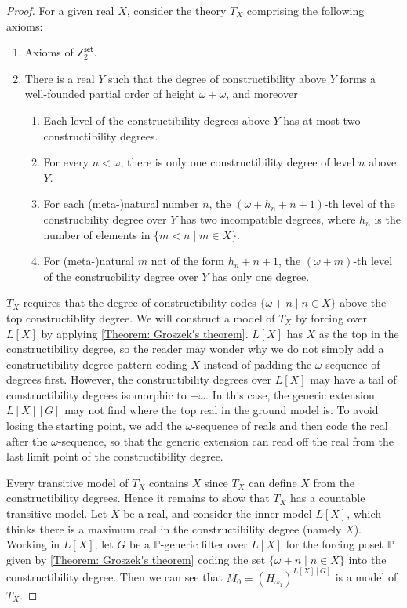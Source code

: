\documentclass[10pt,a4paper]{amsart}
\newcommand{\set}{\mathsf{set}}
\begin{document}
\begin{proof}
    For a given real $X$, consider the theory $T_X$ comprising the following axioms:
    \begin{enumerate}
        \item Axioms of $\mathsf{Z}_2^\set$.
        \item There is a real $Y$ such that the degree of constructibility above $Y$ forms a well-founded partial order of height $\omega+\omega$, and moreover
        \begin{enumerate}
            \item Each level of the constructibility degrees above $Y$ has at most two constructibility degrees.
            \item For every $n<\omega$, there is only one constructibility degree of level $n$ above $Y$.
            \item For each (meta-)natural number $n$, the $(\omega+h_n+n+1)$-th level of the construcbility degree over $Y$ has two incompatible degrees, where $h_n$ is the number of elements in $\{m<n\mid m\in X\}$.
            \item For (meta-)natural $m$ not of the form $h_n+n+1$, the $(\omega+m)$-th level of the construcbility degree over $Y$ has only one degree.
        \end{enumerate}
    \end{enumerate}
    $T_X$ requires that the degree of constructibility codes $\{\omega + n\mid n\in X\}$ above the top constructiblity degree. 
    We will construct a model of $T_X$ by forcing over $L[X]$ by applying \autoref{Theorem: Groszek's theorem}. $L[X]$ has $X$ as the top in the constructibility degree, so the reader may wonder why we do not simply add a constructibility degree pattern coding $X$ instead of padding the $\omega$-sequence of degrees first.
    However, the constructibility degrees over $L[X]$ may have a tail of constructibility degrees isomorphic to $-\omega$. In this case, the generic extension $L[X][G]$ may not find where the top real in the ground model is. To avoid losing the starting point, we add the $\omega$-sequence of reals and then code the real after the $\omega$-sequence, so that the generic extension can read off the real from the last limit point of the constructibility degree.

    Every transitive model of $T_X$ contains $X$ since $T_X$ can define $X$ from the constructibility degrees. Hence it remains to show that $T_X$ has a countable transitive model.
    Let $X$ be a real, and consider the inner model $L[X]$, which thinks there is a maximum real in the constructibility degree (namely $X$).
    Working in $L[X]$, let $G$ be a $\mathbb{P}$-generic filter over $L[X]$ for the forcing poset $\mathbb{P}$ given by \autoref{Theorem: Groszek's theorem} coding the set $\{\omega+n\mid n\in X\}$ into the constructibility degree. Then we can see that $M_0 = (H_{\omega_1})^{L[X][G]}$ is a model of $T_X$.
    

\end{proof}
\end{document}
